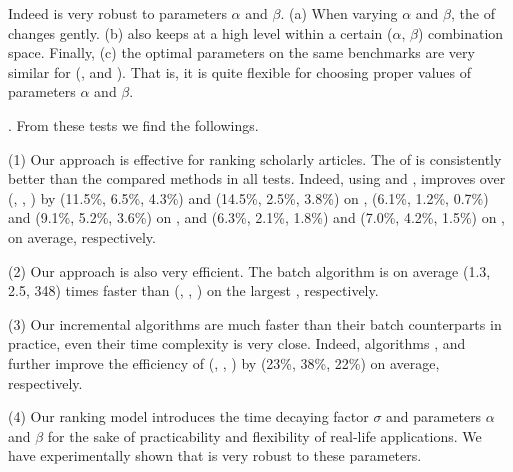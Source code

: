 Indeed \ensemblerank is very robust to parameters $\alpha$ and $\beta$.
(a) When varying $\alpha$ and $\beta$, the \PairAcc of \ensemblerank changes gently. (b) \PairAcc also keeps at a high level within a certain ($\alpha$, $\beta$)  combination space. Finally, (c) the optimal parameters on the same benchmarks are very similar for (\aan, \aminer and \magdata). That is, it is quite flexible for choosing proper values
of  parameters $\alpha$ and $\beta$.




.
From these tests we find the followings.


\noindent(1) Our approach \ensemblerank is effective for ranking scholarly articles. %
The \PairAcc of \ensemblerank is consistently better than the compared methods in all tests. Indeed, using \recom and \fcita, \ensemblerank improves \PairAcc over (\pagerank, \futurerank, \hhgrank) by (11.5\%, 6.5\%, 4.3\%) and (14.5\%, 2.5\%, 3.8\%) on \aan, (6.1\%, 1.2\%, 0.7\%) and (9.1\%, 5.2\%, 3.6\%) on \aminer, and (6.3\%, 2.1\%, 1.8\%) and (7.0\%, 4.2\%, 1.5\%) on \magdata, on average, respectively.


\noindent(2) Our approach \ensemblerank is also very efficient.
%
The batch algorithm \batensemble is on average (1.3, 2.5, 348) times faster than (\powensemble, \futurerank, \hhgrank)  on the largest \magdata, respectively.
%

\noindent (3) Our incremental algorithms are much faster than their batch counterparts in practice, even their time complexity is very close. Indeed, algorithms \inctwprdag, \inctwprscc and \incensemble further improve the efficiency of (\twprdag, \twprscc, \batensemble) by (23\%, 38\%, 22\%) on average, respectively.


\noindent(4) Our ranking model \ensemblerank introduces the time decaying factor $\sigma$ and parameters $\alpha$ and $\beta$ for the sake of practicability and flexibility of real-life applications. We have experimentally shown that \ensemblerank is very robust to these parameters.


